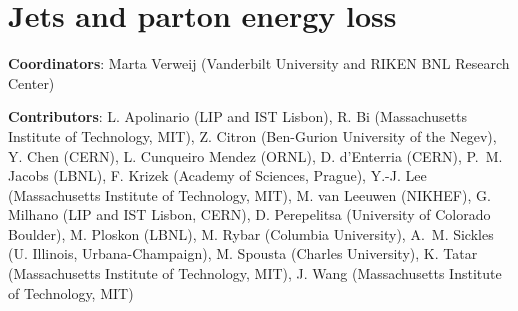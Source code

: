 \documentclass[../report.tex]{subfiles}
\providecommand{\main}{..}
\begin{document}
\section{Jets and parton energy loss}\label{sec:HI_Jets}

{ \small
  \noindent \textbf{Coordinators}: Marta Verweij (Vanderbilt University and RIKEN BNL Research Center)
  
  \noindent \textbf{Contributors}:
L. Apolinario (LIP and IST Lisbon),
R. Bi (Massachusetts Institute of Technology, MIT),
Z. Citron (Ben-Gurion University of the Negev),
Y. Chen (CERN),
L. Cunqueiro Mendez (ORNL),
D. d'Enterria (CERN),
P.~M. Jacobs (LBNL),
F. Krizek (Academy of Sciences, Prague),
Y.-J. Lee (Massachusetts Institute of Technology, MIT),
M. van Leeuwen (NIKHEF),
G. Milhano (LIP and IST Lisbon, CERN),
D. Perepelitsa (University of Colorado Boulder),
M. Ploskon (LBNL),
M. Rybar (Columbia University),
A.~M. Sickles (U. Illinois, Urbana-Champaign),
M. Spousta (Charles University),
K. Tatar (Massachusetts Institute of Technology, MIT),
J. Wang  (Massachusetts Institute of Technology, MIT)
}



\newpage

\newpage

\newpage


\end{document}
